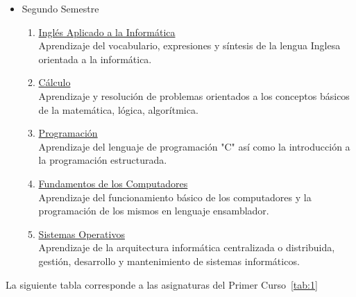 \begin{itemize}
\item Segundo Semestre
\begin{enumerate}[resume]
\item \underline{Inglés Aplicado a la Informática}\\Aprendizaje del vocabulario, expresiones y síntesis de la lengua Inglesa orientada a la informática. 
\item \underline{Cálculo}\\Aprendizaje y resolución de problemas orientados a  los conceptos básicos de la matemática, lógica, algorítmica.
\item \underline{Programación}\\Aprendizaje del lenguaje de programación "C" así como la introducción a la programación estructurada. 
\item \underline{Fundamentos de los Computadores}\\Aprendizaje del funcionamiento básico de los computadores y la programación de los mismos en lenguaje ensamblador. 
\item \underline{Sistemas Operativos}\\Aprendizaje de la arquitectura informática centralizada o distribuida, gestión, desarrollo y mantenimiento de sistemas informáticos.
\end{enumerate}
\end{itemize}
La siguiente tabla corresponde a las asignaturas del Primer Curso~\ref{tab:1}
